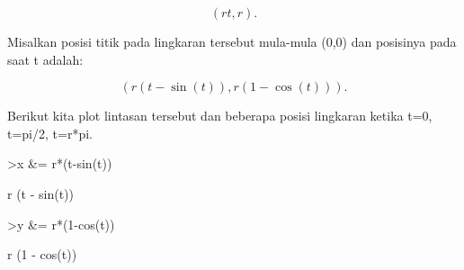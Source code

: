 \documentclass{article}
\begin{document}
\begin{eulernotebook}
\begin{eulercomment}
\begin{eulercomment}
\begin{eulercomment}
\begin{eulercomment}
\begin{eulercomment}
\end{eulercomment}
\begin{eulerformula}
\[
(rt,r).
\]
\end{eulerformula}
\begin{eulercomment}
Misalkan posisi titik pada lingkaran tersebut mula-mula (0,0) dan
posisinya pada saat t adalah:

\end{eulercomment}
\begin{eulerformula}
\[
(r(t-\sin(t)),r(1-\cos(t))).
\]
\end{eulerformula}
\begin{eulercomment}
Berikut kita plot lintasan tersebut dan beberapa posisi lingkaran
ketika t=0, t=pi/2, t=r*pi.
\end{eulercomment}
\begin{eulerprompt}
>x &= r*(t-sin(t))
\end{eulerprompt}
\begin{euleroutput}
  
                              r (t - sin(t))
  
\end{euleroutput}
\begin{eulerprompt}
>y &= r*(1-cos(t))
\end{eulerprompt}
\begin{euleroutput}
  
                              r (1 - cos(t))
  

\end{euleroutput}
\end{eulercomment}
\end{eulercomment}
\end{eulercomment}
\end{eulercomment}
\end{eulernotebook}
\end{document}
